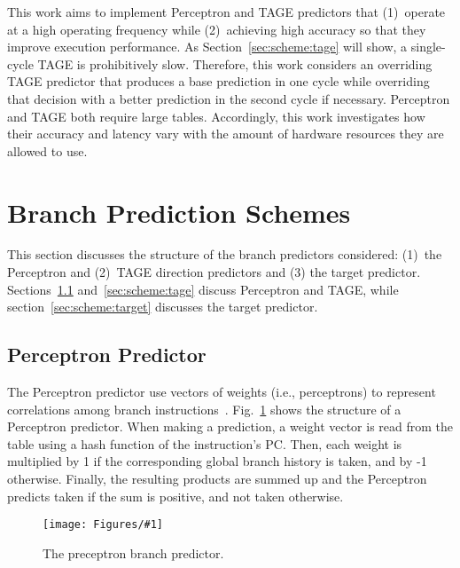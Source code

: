 \documentclass[conference]{IEEEtran}
\newcommand{\kfig}[4]{ %
        \begin{figure}[!t]
        \centering
        \texttt{[image: Figures/\#1]}
        \vspace{-1mm}
        \caption{#3}
        \label{#2}
        \end{figure}
}
\begin{document}
This work aims to implement Perceptron and TAGE predictors that (1)\ operate at a high operating frequency while (2)\ achieving high accuracy so that they improve execution performance. As Section~\ref{sec:scheme:tage} will show, a single-cycle TAGE is prohibitively slow. Therefore, this work considers an overriding TAGE predictor that produces a base prediction in one cycle while overriding that decision with a better prediction in the second cycle if necessary. Perceptron and TAGE both require large tables. Accordingly, this work investigates how their accuracy and latency vary with the amount of hardware resources they are allowed to use.

\section{Branch Prediction Schemes}
\label{sec:scheme}
This section discusses the structure of the branch predictors considered: (1)\ the Perceptron and (2)\ TAGE direction predictors and (3) the target predictor. Sections~\ref{sec:scheme:perceptron} and~\ref{sec:scheme:tage} discuss Perceptron and TAGE, while section~\ref{sec:scheme:target} discusses the target predictor.

\subsection{Perceptron Predictor}
\label{sec:scheme:perceptron}
The Perceptron predictor use vectors of weights (i.e., perceptrons) to represent correlations among branch instructions~\cite{perceptron}. Fig.~\ref{fig:perceptron} shows the structure of a Perceptron predictor. When making a prediction, a weight vector is read from the table using a hash function of the instruction's PC. Then, each weight is multiplied by 1 if the corresponding global branch history is taken, and by -1 otherwise. Finally, the resulting products are summed up and the Perceptron predicts taken if the sum is positive, and not taken otherwise.
\kfig{perceptron.pdf}{fig:perceptron}{The preceptron branch predictor.}{angle = 0, trim = 1in 3.5in 2in 1.1in, clip, width=0.3\textwidth}
\end{document}
